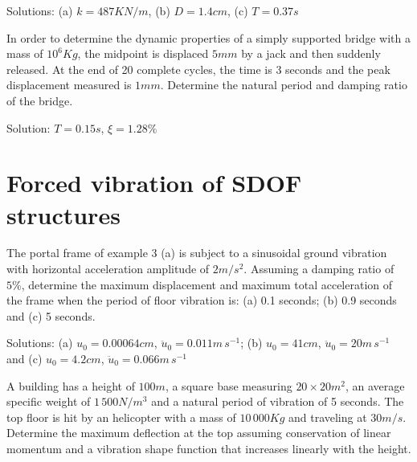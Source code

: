 \documentclass{problems}
\begin{document}
\begin{center}
\end{center}

Solutions: (a) $k = 487KN/m$, (b) $D = 1.4cm$, (c) $T = 0.37s$



In order to determine the dynamic properties of a simply supported bridge with a mass of $10^6Kg$, the midpoint is displaced $5mm$ by a jack and then suddenly released. At the end of 20 complete cycles, the time is 3 seconds and the peak displacement measured is $1mm$. Determine the natural period and damping ratio of the bridge.

\begin{center}
\end{center}

Solution: $T=0.15s$, $\xi=1.28\%$



\section{Forced vibration of SDOF structures}


 The portal frame of example 3 (a) is subject to a sinusoidal ground vibration with horizontal acceleration amplitude of $2m/s^2$. Assuming a damping ratio of $5\%$, determine the maximum displacement and maximum total acceleration of the frame when the period of floor vibration is: (a) 0.1 seconds; (b) 0.9 seconds and (c) 5 seconds.

\begin{center}
\end{center}

Solutions: (a) $u_0 = 0.00064cm$, $\ddot{u}_0 = 0.011m\,s^{-1}$; (b) $u_0 = 41cm$, $\ddot{u}_0 = 20m\,s^{-1}$ and (c) $u_0 = 4.2cm$, $\ddot{u}_0 = 0.066m\,s^{-1}$



 A building has a height of $100m$, a square base measuring $20\times20m^2$, an average specific weight of $1\,500N/m^3$ and a natural period of vibration of 5 seconds. The top floor is hit by an helicopter with a mass of $10\,000Kg$ and traveling at $30m/s$. Determine the maximum deflection at the top assuming conservation of linear momentum and a vibration shape function that increases linearly with the height.
\end{document}
